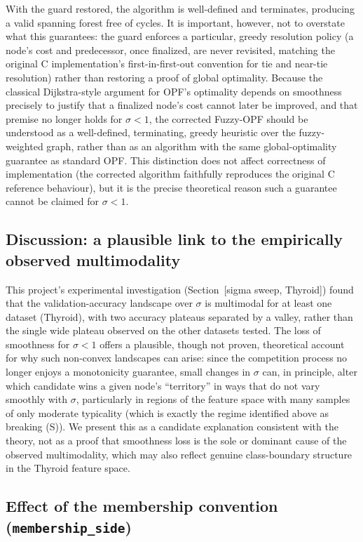 With the guard restored, the algorithm is well-defined and terminates, producing a valid spanning forest free of cycles. It is important, however, not to overstate what this guarantees: the guard enforces a particular, greedy resolution policy (a node's cost and predecessor, once finalized, are never revisited, matching the original C implementation's first-in-first-out convention for tie and near-tie resolution) rather than restoring a proof of global optimality. Because the classical Dijkstra-style argument for OPF's optimality depends on smoothness precisely to justify that a finalized node's cost cannot later be improved, and that premise no longer holds for $\sigma < 1$, the corrected Fuzzy-OPF should be understood as a well-defined, terminating, greedy heuristic over the fuzzy-weighted graph, rather than as an algorithm with the same global-optimality guarantee as standard OPF. This distinction does not affect correctness of implementation (the corrected algorithm faithfully reproduces the original C reference behaviour), but it is the precise theoretical reason such a guarantee cannot be claimed for $\sigma < 1$.

\subsection{Discussion: a plausible link to the empirically observed multimodality}

This project's experimental investigation (Section~[sigma sweep, Thyroid]) found that the validation-accuracy landscape over $\sigma$ is multimodal for at least one dataset (Thyroid), with two accuracy plateaus separated by a valley, rather than the single wide plateau observed on the other datasets tested. The loss of smoothness for $\sigma < 1$ offers a plausible, though not proven, theoretical account for why such non-convex landscapes can arise: since the competition process no longer enjoys a monotonicity guarantee, small changes in $\sigma$ can, in principle, alter which candidate wins a given node's ``territory'' in ways that do not vary smoothly with $\sigma$, particularly in regions of the feature space with many samples of only moderate typicality (which is exactly the regime identified above as breaking (S)). We present this as a candidate explanation consistent with the theory, not as a proof that smoothness loss is the sole or dominant cause of the observed multimodality, which may also reflect genuine class-boundary structure in the Thyroid feature space.

\subsection{Effect of the membership convention (\texttt{membership\_side})}

